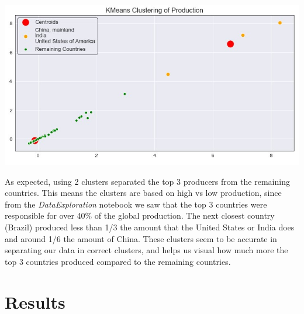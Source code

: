 \documentclass[12pt, a4paper]{article}
\begin{document}
\begin{spacing}{1.1}

	\begin{center}
	\includegraphics[scale=.8]{kmeans}
	\end{center}
	As expected, using 2 clusters separated the top 3 producers from the remaining countries. This means the clusters are based on high vs low production, since from the \textit{DataExploration} notebook we saw that the top 3 countries were responsible for over 40\% of the global production. The next closest country (Brazil) produced less than 1/3 the amount that the United States or India does and around 1/6 the amount of China. These clusters seem to be accurate in separating our data in correct clusters, and helps us visual how much more the top 3 countries produced compared to the remaining countries.\vspace*{2mm}
	
	\section{Results}
	

	





	\newpage
	


\end{spacing}
\end{document}
